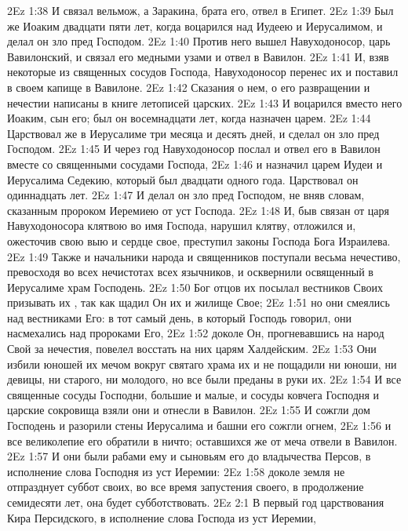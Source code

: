 \vs 2Ez 1:38 И связал вельмож, а Заракина, брата его, отвел в Египет.
\rsbpar\vs 2Ez 1:39 Был же Иоаким двадцати пяти лет, когда воцарился над Иудеею и Иерусалимом, и делал он зло пред Господом.
\rsbpar\vs 2Ez 1:40 Против него вышел Навуходоносор, царь Вавилонский, и связал его медными узами и отвел в Вавилон.
\vs 2Ez 1:41 И, взяв некоторые из священных сосудов Господа, Навуходоносор перенес их и поставил в своем капище в Вавилоне.
\rsbpar\vs 2Ez 1:42 Сказания о нем, о его развращении и нечестии написаны в книге летописей царских.
\rsbpar\vs 2Ez 1:43 И воцарился вместо него Иоаким, сын его; был он восемнадцати лет, когда назначен царем.
\vs 2Ez 1:44 Царствовал же в Иерусалиме три месяца и десять дней, и сделал он зло пред Господом.
\vs 2Ez 1:45 И через год Навуходоносор послал и отвел его в Вавилон вместе со священными сосудами Господа,
\vs 2Ez 1:46 и назначил царем Иудеи и Иерусалима Седекию, который был двадцати одного года. Царствовал он одиннадцать лет.
\vs 2Ez 1:47 И делал он зло пред Господом, не вняв словам, сказанным пророком Иеремиею от уст Господа.
\vs 2Ez 1:48 И, быв связан от царя Навуходоносора клятвою во имя Господа, нарушил клятву, отложился и, ожесточив свою выю и сердце свое, преступил законы Господа Бога Израилева.
\vs 2Ez 1:49 Также и начальники народа и священников поступали весьма нечестиво, превосходя во всех нечистотах всех язычников, и осквернили освященный в Иерусалиме храм Господень.
\vs 2Ez 1:50 Бог отцов их посылал вестников Своих призывать их , так как щадил Он их и жилище Свое;
\vs 2Ez 1:51 но они смеялись над вестниками Его: в тот самый день, в который Господь говорил, они насмехались над пророками Его,
\vs 2Ez 1:52 доколе Он, прогневавшись на народ Свой за нечестия, повелел восстать на них царям Халдейским.
\vs 2Ez 1:53 Они избили юношей их мечом вокруг святаго храма их и не пощадили ни юноши, ни девицы, ни старого, ни молодого, но все были преданы в руки их.
\vs 2Ez 1:54 И все священные сосуды Господни, большие и малые, и сосуды ковчега Господня и царские сокровища взяли они и отнесли в Вавилон.
\vs 2Ez 1:55 И сожгли дом Господень и разорили стены Иерусалима и башни его сожгли огнем,
\vs 2Ez 1:56 и все великолепие его обратили в ничто; оставшихся же от меча отвели в Вавилон.
\vs 2Ez 1:57 И они были рабами ему и сыновьям его до владычества Персов, в исполнение слова Господня из уст Иеремии:
\vs 2Ez 1:58 доколе земля не отпразднует суббот своих, во все время запустения своего, в продолжение семидесяти лет, она будет субботствовать.
\vs 2Ez 2:1 В первый год царствования Кира Персидского, в исполнение слова Господа из уст Иеремии,
